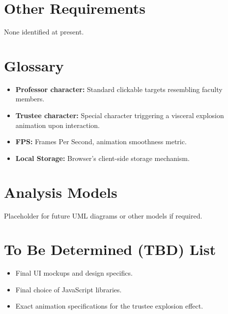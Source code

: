 \documentclass{scrreprt}
\begin{document}
\chapter{Other Requirements}
None identified at present.

\appendix

\chapter{Glossary}
\begin{itemize}
    \item \textbf{Professor character:} Standard clickable targets resembling faculty members.
    \item \textbf{Trustee character:} Special character triggering a visceral explosion animation upon interaction.
    \item \textbf{FPS:} Frames Per Second, animation smoothness metric.
    \item \textbf{Local Storage:} Browser's client-side storage mechanism.
\end{itemize}

\chapter{Analysis Models}
Placeholder for future UML diagrams or other models if required.

\chapter{To Be Determined (TBD) List}
\begin{itemize}
    \item Final UI mockups and design specifics.
    \item Final choice of JavaScript libraries.
    \item Exact animation specifications for the trustee explosion effect.
\end{itemize}
\end{document}
